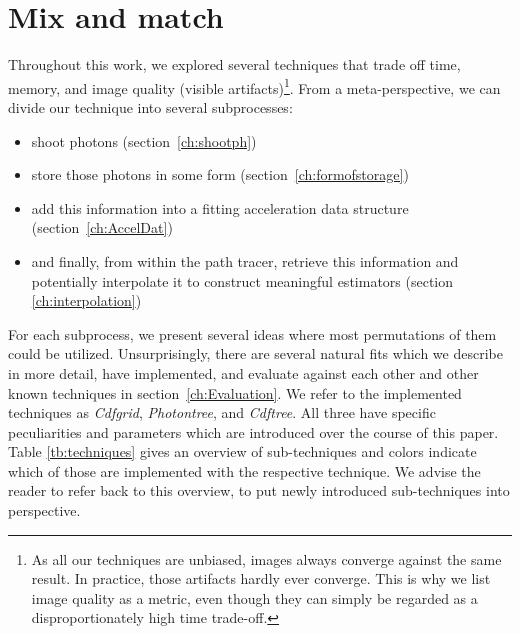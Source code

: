 \section{Mix and match}
\label{sec:mixandmatch}
Throughout this work, we explored several techniques that trade off time, memory, and image quality (visible artifacts)\footnote{As all our techniques are unbiased, images always converge against the same result. In practice, those artifacts hardly ever converge. This is why we list image quality as a metric, even though they can simply be regarded as a disproportionately high time trade-off.}. From a meta-perspective, we can divide our technique into several subprocesses:

\begin{itemize}
    \item shoot photons (section~\ref{ch:shootph})
    \item store those photons in some form (section~\ref{ch:formofstorage})
    \item add this information into a fitting acceleration data structure (section~\ref{ch:AccelDat})
    \item and finally, from within the path tracer, retrieve this information and potentially interpolate it to construct meaningful estimators (section \ref{ch:interpolation})
\end{itemize}

For each subprocess, we present several ideas where most permutations of them could be utilized. Unsurprisingly, there are several natural fits which we describe in more detail, have implemented, and evaluate against each other and other known techniques in section~\ref{ch:Evaluation}. We refer to the implemented techniques as \textit{Cdfgrid}, \textit{Photontree}, and \textit{Cdftree}. All three have specific peculiarities and parameters which are introduced over the course of this paper. Table \ref{tb:techniques} gives an overview of sub-techniques and colors indicate which of those are implemented with the respective technique. We advise the reader to refer back to this overview, to put newly introduced sub-techniques into perspective.

